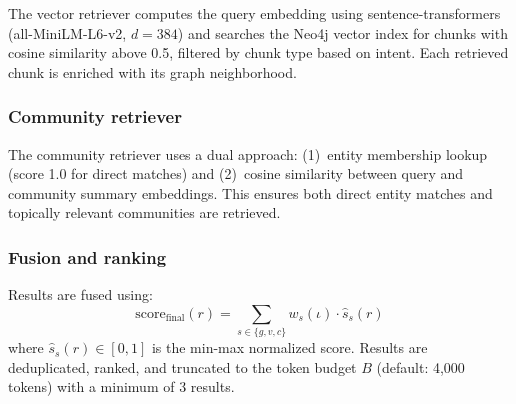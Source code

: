 \documentclass[review]{elsarticle}
\begin{document}
The vector retriever computes the query embedding using sentence-transformers (all-MiniLM-L6-v2, $d=384$) and searches the Neo4j vector index for chunks with cosine similarity above 0.5, filtered by chunk type based on intent. Each retrieved chunk is enriched with its graph neighborhood.

\subsubsection{Community retriever}

The community retriever uses a dual approach: (1)~entity membership lookup (score 1.0 for direct matches) and (2)~cosine similarity between query and community summary embeddings. This ensures both direct entity matches and topically relevant communities are retrieved.

\subsubsection{Fusion and ranking}

Results are fused using:
\begin{equation}
\text{score}_{\text{final}}(r) = \sum_{s \in \{g, v, c\}} w_s(\iota) \cdot \hat{s}_s(r)
\label{eq:fusion}
\end{equation}
where $\hat{s}_s(r) \in [0, 1]$ is the min-max normalized score. Results are deduplicated, ranked, and truncated to the token budget $B$ (default: 4,000 tokens) with a minimum of 3 results.


\end{document}

